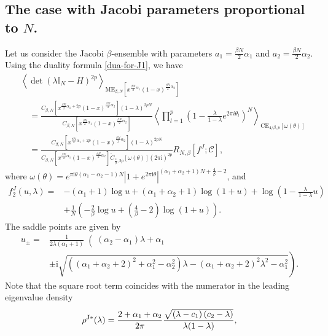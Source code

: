 \documentclass[11pt,a4paper]{article}
\numberwithin{equation}{section} %
\theoremstyle{plain}
\theoremstyle{definition}
\numberwithin{prop}{section}
\numberwithin{cor}{section}
\numberwithin{remark}{section}
\begin{document}
\subsection{The case with Jacobi parameters proportional to $N$.}\label{S5.2}
Let us consider the Jacobi $\beta$-ensemble with parameters $a_1=\frac{\beta N}{2}\alpha_1$ and $a_2=\frac{\beta N}{2}\alpha_2$. Using the duality formula \eqref{dua-for-J1}, we have
\begin{align*}
    & \left\langle\operatorname{det}\left(\lambda \mathbb{I}_N-H\right)^{2p}\right\rangle_{\mathrm{ME}_{\beta, N}\left[x^{\frac{\beta N}{2}\alpha_1}(1-x)^{\frac{\beta N}{2}\alpha_2}\right]} \\
& \quad =\frac{C_{\beta,N}[x^{\frac{\beta N}{2}\alpha_1+2p}(1-x)^{\frac{\beta N}{2}\alpha_2}](1-\lambda)^{2p N}}{C_{\beta,N}[x^{\frac{\beta N}{2}\alpha_1}(1-x)^{\frac{\beta N}{2}\alpha_2}]}\left\langle\prod_{l=1}^p\left(1-\frac{\lambda}{1-\lambda} e^{2 \pi i \theta_l}\right)^N\right\rangle_{\mathrm{CE}_{4 / \beta, p}\left[\omega(\theta)\right]}\\
&\quad =\frac{C_{\beta,N}[x^{\frac{\beta N}{2}\alpha_1+2p}(1-x)^{\frac{\beta N}{2}\alpha_2}](1-\lambda)^{2p N}}{C_{\beta,N}[x^{\frac{\beta N}{2}\alpha_1}(1-x)^{\frac{\beta N}{2}\alpha_2}]\tilde{C}_{\frac{4}{\beta},2p}[\omega(\theta)](2\pi \mathrm{i})^{2p}}R_{N,\beta}[f^J;\mathcal{C}],
\end{align*}
where $\omega(\theta)=e^{\pi \mathrm{i}\theta(\alpha_1-\alpha_2-1)N}|1+e^{2\pi \mathrm{i}\theta}|^{(\alpha_1+\alpha_2+1)N+\frac{4}{\beta}-2} $, and 
\begin{align*}
    f^J_2(u,\lambda)=&-(\alpha_1+1)\log u+(\alpha_1+\alpha_2+1)\log (1+u)+\log\left(1-\frac{\lambda}{1-\lambda}u\right)\\
    &+\frac{1}{N}\left(-\frac{2}{\beta}\log u+\left(\frac{4}{\beta}-2\right)\log (1+u)\right).
\end{align*}
The saddle points are given by
\begin{align*}
    u_{\pm}=&\left.\frac{1}{2\lambda(\alpha_1+1)}\right((\alpha_2-\alpha_1)\lambda+\alpha_1\\
    &\left. \pm\mathrm{i}\sqrt{((\alpha_1+\alpha_2+2)^2+\alpha_1^2-\alpha_2^2)\lambda-(\alpha_1+\alpha_2+2)^2\lambda^2-\alpha_1^2}\right).
\end{align*}
Note that the square root term coincides with the numerator in the leading eigenvalue density
\begin{align}\label{lea-eigJ*}
    \rho^{\rm J*}(\lambda) =  \frac{2+\alpha_1+\alpha_2}{2 \pi} \frac{\sqrt{\left(\lambda-c_1\right)\left(c_2-\lambda\right)}}{\lambda(1-\lambda)},
\end{align}
\end{document}
